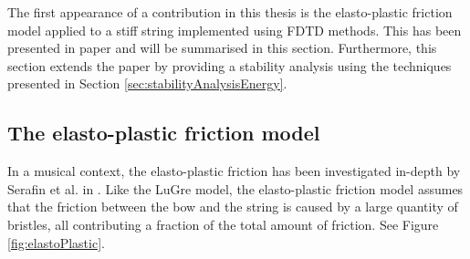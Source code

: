 The first appearance of a contribution in this thesis is the elasto-plastic friction model applied to a stiff string implemented using FDTD methods. This has been presented in paper \citeP[C] and will be summarised in this section. Furthermore, this section extends the paper by providing a stability analysis using the techniques presented in Section \ref{sec:stabilityAnalysisEnergy}.


\subsection{The elasto-plastic friction model}\label{sec:elastoPlastic}
In a musical context, the elasto-plastic friction has been investigated in-depth by Serafin et al. in \cite{Serafin2003, Serafin2004, Avanzini2005}. Like the LuGre model, the elasto-plastic friction model assumes that the friction between the bow and the string is caused by a large quantity of bristles, all contributing a fraction of the total amount of friction. See Figure \ref{fig:elastoPlastic}.



